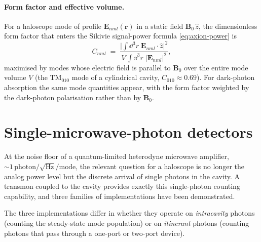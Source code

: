 \paragraph{Form factor and effective volume.}
For a haloscope mode of profile $\bm E_{nml}(\bm r)$ in a static
field $\bm B_0\,\hat z$, the dimensionless form factor that enters
the Sikivie signal-power formula \cref{eq:axion-power} is
\begin{equation}
\label{eq:cavity-form-factor}
C_{nml} \;=\; \frac{\bigl|\!\int\!\dd^3 r\;\bm E_{nml}\!\cdot\!\hat z\bigr|^2}
{V\,\int\!\dd^3 r\;|\bm E_{nml}|^2},
\end{equation}
maximised by modes whose electric field is parallel to $\bm B_0$
over the entire mode volume $V$ (the TM$_{010}$ mode of a
cylindrical cavity, $C_{010}\approx 0.69$). For dark-photon
absorption the same mode quantities appear, with the form factor
weighted by the dark-photon polarisation rather than by $\bm B_0$.

\section{Single-microwave-photon detectors}
\label{sec:single-photon}

\begin{phenomenon}
At the noise floor of a quantum-limited heterodyne microwave
amplifier, $\sim 1\,\text{photon}/\sqrt{\text{Hz}}/\text{mode}$,
the relevant question for a haloscope is no longer the analog
power level but the discrete arrival of single photons in the
cavity. A transmon coupled to the cavity provides exactly this
single-photon counting capability, and three families of
implementations have been demonstrated.
\end{phenomenon}

The three implementations differ in whether they operate on
\emph{intracavity} photons (counting the steady-state mode
population) or on \emph{itinerant} photons (counting photons that
pass through a one-port or two-port device).

